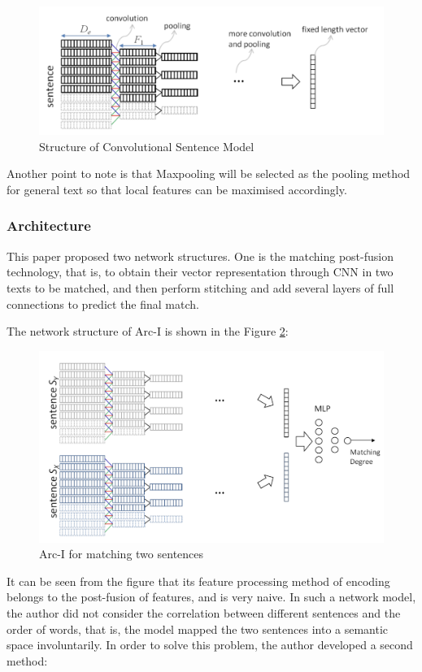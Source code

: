 \begin{figure}[h!]
\centering
\includegraphics[width=.8\textwidth]{cnnamnls1.pdf}
\caption{Structure of Convolutional Sentence Model \cite{hu2015convolutional}}
\label{fig:cnnamnls1}
\end{figure}

Another point to note is that Maxpooling will be selected as the pooling method for general text so that local features can be maximised accordingly.

\subsubsection{Architecture}
This paper proposed two network structures. One is the matching post-fusion technology, that is, to obtain their vector representation through CNN in two texts to be matched, and then perform stitching and add several layers of full connections to predict the final match.

The network structure of Arc-I is shown in the Figure \ref{fig:cnnamnls2}:

\begin{figure}[h!]
\centering
\includegraphics[width=.8\textwidth]{cnnamnls2.pdf}
\caption{Arc-I for matching two sentences \cite{hu2015convolutional}}
\label{fig:cnnamnls2}
\end{figure}

It can be seen from the figure that its feature processing method of encoding belongs to the post-fusion of features, and is very naive. In such a network model, the author did not consider the correlation between different sentences and the order of words, that is, the model mapped the two sentences into a semantic space involuntarily. In order to solve this problem, the author developed a second method:

